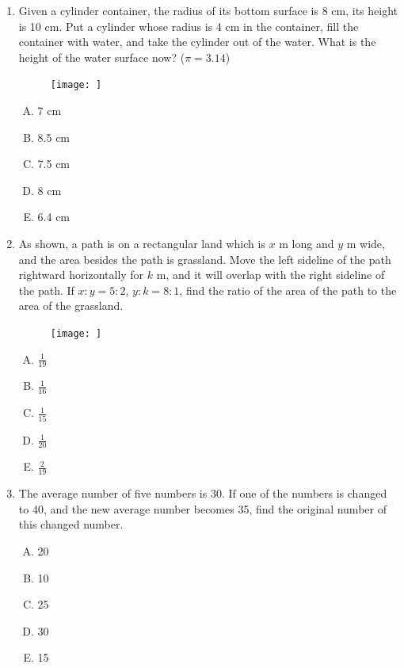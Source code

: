 \documentclass[12pt]{scrartcl}
\begin{document}
\begin{enumerate}
    \item Given a cylinder container, the radius of its bottom surface is 8 cm, its height is 10 cm. Put a cylinder whose radius is 4 cm in the container, fill the container with water, and take the cylinder out of the water. What is the height of the water surface now? ($\pi = 3.14$)
    \begin{figure}[h]
        \centering
        \texttt{[image: ]}
    \end{figure}
    \begin{multicols}{5}
        \begin{enumerate}[(A)]
            \item 7 cm
            \item 8.5 cm
            \item 7.5 cm
            \item 8 cm
            \item 6.4 cm
        \end{enumerate}
    \end{multicols}

    \item As shown, a path is on a rectangular land which is $x$ m long and $y$ m wide, and the area besides the path is grassland. Move the left sideline of the path rightward horizontally for $k$ m, and it will overlap with the right sideline of the path. If $x:y = 5:2$, $y:k = 8:1$, find the ratio of the area of the path to the area of the grassland.
    \begin{figure}[h]
        \centering
        \texttt{[image: ]}
    \end{figure}
    \begin{multicols}{5}
        \begin{enumerate}[(A)]
            \item $\frac{1}{19}$
            \item $\frac{1}{16}$
            \item $\frac{1}{15}$
            \item $\frac{1}{20}$
            \item $\frac{2}{19}$
        \end{enumerate}
    \end{multicols}

    \item The average number of five numbers is 30. If one of the numbers is changed to 40, and the new average number becomes 35, find the original number of this changed number.
    \begin{multicols}{5}
        \begin{enumerate}[(A)]
            \item 20
            \item 10
            \item 25
            \item 30
            \item 15
        \end{enumerate}
    \end{multicols}


\end{enumerate}
\end{document}
